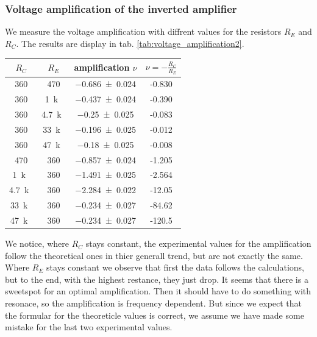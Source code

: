 \documentclass[a4paper,10pt]{article}
\numberwithin{equation}{section}
\begin{document}
\begin{multicols}{2}
	\subsubsection*{Voltage amplification of the inverted amplifier}
	We measure the voltage amplification with diffrent values for the resistors $R_E$ and $R_C$. The results are display in tab. \ref{tab:voltage_amplification2}.
	\begin{center}
		\begin{tabular}{|c|c|c|c|}
			\hline
			$R_C$             & $R_E$             & amplification $\nu$  & $\nu = -\frac{R_C}{R_E}$ \\
			\hline
			\SI{360}{\Omega}  & \SI{470}{\Omega}  & \SI{-0.686+-0.024}{} & -0.830                   \\
			\SI{360}{\Omega}  & \SI{1}{k\Omega}   & \SI{-0.437+-0.024}{} & -0.390                   \\
			\SI{360}{\Omega}  & \SI{4.7}{k\Omega} & \SI{-0.25+-0.025}{}  & -0.083                   \\
			\SI{360}{\Omega}  & \SI{33}{k\Omega}  & \SI{-0.196+-0.025}{} & -0.012                   \\
			\SI{360}{\Omega}  & \SI{47}{k\Omega}  & \SI{-0.18+-0.025}{}  & -0.008                   \\
			\hline
			\SI{470}{\Omega}  & \SI{360}{\Omega}  & \SI{-0.857+-0.024}{} & -1.205                   \\
			\SI{1}{k\Omega}   & \SI{360}{\Omega}  & \SI{-1.491+-0.025}{} & -2.564                   \\
			\SI{4.7}{k\Omega} & \SI{360}{\Omega}  & \SI{-2.284+-0.022}{} & -12.05                   \\
			\SI{33}{k\Omega}  & \SI{360}{\Omega}  & \SI{-0.234+-0.027}{} & -84.62                   \\
			\SI{47}{k\Omega}  & \SI{360}{\Omega}  & \SI{-0.234+-0.027}{} & -120.5                   \\
			\hline
		\end{tabular}
		\label{tab:voltage_amplification2}
	\end{center}
	We notice, where $R_C$ stays constant, the experimental values for the amplification follow the theoretical ones in thier generall trend, but are not exactly the same. Where $R_E$ stays constant we observe that first the data follows the calculations, but to the end, with the highest restance, they just drop. It seems that there is a sweetspot for an optimal amplification. Then it should have to do something with resonace, so the amplification is frequency dependent. But since we expect that the formular for the theoreticle values is correct, we assume we have made some mistake for the last two experimental values.


\end{multicols}
\end{document}
